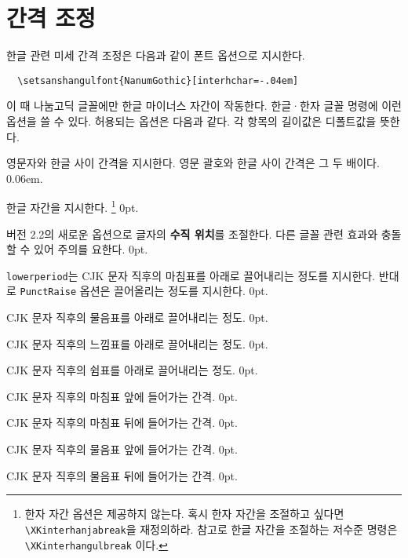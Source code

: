 \documentclass[a4paper]{article}
\def\cs#1{\texttt{\textbackslash #1}}
\def\hemph#1{\textsf{\bfseries #1}}
\begin{document}
\section{간격 조정}
한글 관련 미세 간격 조정은 다음과 같이 폰트 옵션으로 지시한다.
\begin{verbatim}
  \setsanshangulfont{NanumGothic}[interhchar=-.04em]
\end{verbatim}
이 때 나눔고딕 글꼴에만 한글 마이너스 자간이 작동한다.
 한글·한자 글꼴
명령에 이런 옵션을 쓸 수 있다.
허용되는 옵션은 다음과 같다. 각 항목의 길이값은 디폴트값을 뜻한다.
\begin{description}\itemsep0pt
\item[hu, InterLatinCJK]
  영문자와 한글 사이 간격을 지시한다.
  영문 괄호와 한글 사이 간격은 그 두 배이다. 0.06em.
\item[interhchar, InterHangul]
  { 한글 자간을} 지시한다.%
  \footnote{한자 자간 옵션은 제공하지 않는다.
  혹시 한자 자간을 조절하고 싶다면 \cs{XKinterhanjabreak}을 재정의하라.
  참고로 한글 자간을 조절하는 저수준 명령은 \cs{XKinterhangulbreak} 이다.}
  0pt.
\item[charraise, CharRaise]
  버전 2.2의 새로운 옵션으로
  글자의 \hemph{수직 위치}를 조절한다.
  다른 글꼴 관련 효과와 충돌할 수 있어 주의를 요한다. 0pt.
\item[lowerperiod, PunctRaise]
  \verb+lowerperiod+는 CJK 문자 직후의 마침표를 아래로 끌어내리는
  {정도를 지시한다.
  반대로 \verb+PunctRaise+ 옵션은 끌어올리는 정도를 지시한다. 0pt.}
\item[lowerquestion]
  CJK 문자 직후의 물음표를 아래로 끌어내리는 정도. 0pt.
\item[lowerexclamation]
  CJK 문자 직후의 느낌표를 아래로 끌어내리는 정도. 0pt.
\item[lowercomma]
  CJK 문자 직후의 쉼표를 아래로 끌어내리는 정도. 0pt.
\item[preperiodkern]
  {CJK 문자 직후의 마침표 앞에
  들어가는 간격. 0pt.}
\item[postperiodkern]
  {CJK 문자 직후의 마침표 뒤에
  들어가는 간격. 0pt.}
\item[prequestionkern]
  CJK 문자 직후의 물음표 앞에 들어가는 간격. 0pt.
\item[postquestionkern]
  CJK 문자 직후의 물음표 뒤에 들어가는 간격. 0pt.
\item[preexclamationkern]

\end{description}
\end{document}
